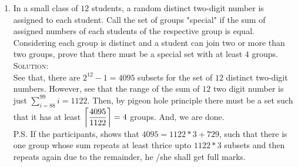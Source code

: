\documentclass{article}
\begin{document}
\begin{enumerate}
    \item In a small class of $12$ students, a random distinct two-digit number is assigned to each student. Call the set of groups "special" if the sum of assigned numbers of each students of the respective group is equal. Considering each group is distinct and a student can join two or more than two groups, prove that there must be a special set with at least $4$ groups.\newline
    \textsc{Solution: }\\
    See that, there are $2^{12}-1=4095$ subsets for the set of $12$ distinct two-digit numbers. However, see that the range of the sum of $12$ two digit number is just $\displaystyle{\sum_{i=88}^{99} i = 1122}$. Then, by pigeon hole principle there must be a set such that it has at least $\displaystyle{\bigg{\lceil} \frac{4095}{1122} \bigg{\rceil}=4}$ groups. And, we are done.
    \\
    P.S. If the participants, shows that $4095= 1122*3+729$, such that there is one group whose sum repeats at least thrice upto $1122*3$ subsets and then repeats again due to the remainder, he /she shall get full marks.
    
\end{enumerate}
\end{document}
